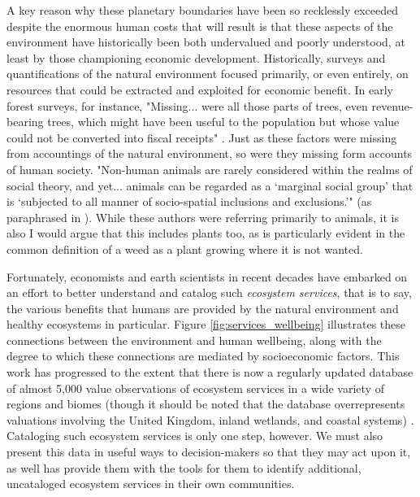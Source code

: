 \documentclass[notitlepage]{article}
\begin{document}
A key reason why these planetary boundaries have been so recklessly exceeded despite the enormous human costs that will result is that these aspects of the environment have historically been both undervalued and poorly understood, at least by those championing economic development. Historically, surveys and quantifications of the natural environment focused primarily, or even entirely, on resources that could be extracted and exploited for economic benefit. In early forest surveys, for instance, "Missing... were all those parts of trees, even revenue-bearing trees, which might have been useful to the population but whose value could not be converted into fiscal receipts" \cite{scottSeeingStateHow2020}. Just as these factors were missing from accountings of the natural environment, so were they missing form accounts of human society. "Non-human animals are rarely considered within the realms of social theory, and yet... animals can be regarded as a `marginal social group' that is `subjected to all manner of socio-spatial inclusions and exclusions.'" (\cite{philolAnimalsGeographyCity1995,westcoatBringingAnimalsBack1995,wolchAnimalGeographiesPlace1998}as paraphrased in \cite{harrisRethinkingMapsMorethanhuman2011}). While these authors were referring primarily to animals, it is also  I would argue that this includes plants too, as is particularly evident in the common definition of a weed as a plant growing where it is not wanted.

Fortunately, economists and earth scientists in recent decades have embarked on an effort to better understand and catalog such \textit{ecosystem services}, that is to say, the various benefits that humans are provided by the natural environment and healthy ecosystems in particular. Figure \ref{fig:services_wellbeing} illustrates these connections between the environment and human wellbeing, along with the degree to which these connections are mediated by socioeconomic factors. This work has progressed to the extent that there is now a regularly updated database of almost 5,000 value observations of ecosystem services in a wide variety of regions and biomes (though it should be noted that the database overrepresents valuations involving the United Kingdom, inland wetlands, and coastal systems) \cite{grootEcosystemServicesValuation2020}. Cataloging such ecosystem services is only one step, however. We must also present this data in useful ways to decision-makers  so that they may act upon it, as well has provide them with the tools for them to identify additional, uncataloged ecosystem services in their own communities.
\end{document}

